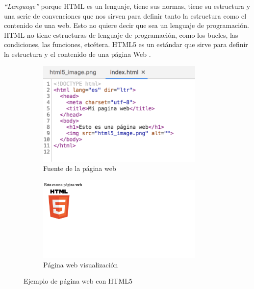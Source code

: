 \textit{``Language''} porque HTML es un lenguaje, tiene sus normas, tiene su estructura y una serie de convenciones que nos sirven para definir tanto la estructura como el contenido de una web. Esto no quiere decir que sea un lenguaje de programación. HTML no tiene estructuras de lenguaje de programación, como los bucles, las condiciones, las funciones, etcétera. HTML5 es un estándar que sirve para definir la estructura y el contenido de una página Web \cite{html2}. 

\begin{figure}[H]
    \begin{subfigure}[b]{0.5\textwidth}
  \centering
    \includegraphics[width=0.9\textwidth, height=0.5\textwidth]{chapters/images/simplehtmlpage.png}
    \caption{Fuente de la página web}
    \label{fig:f2}
  \end{subfigure}
  \begin{subfigure}[b]{0.5\textwidth}
  \centering
    \includegraphics[width=0.9\textwidth, height=0.5\textwidth]{chapters/images/simplehtml.png}
    \caption{Página web visualización}
    \label{fig:f1}
  \end{subfigure}
  \hfill
  
  \caption{Ejemplo de página web con HTML5}
\end{figure}

